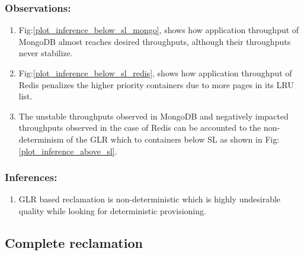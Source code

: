 	\subsubsection{Observations:}
	  \begin{enumerate}
	    \item Fig:\ref{plot_inference_below_sl_mongo}, shows how application throughput of MongoDB almost reaches desired 
throughputs, although their throughputs never stabilize.
	    \item Fig:\ref{plot_inference_below_sl_redis}, shows how application throughput of Redis penalizes the higher priority 
containers due to more pages in its LRU list.
	    \item The unstable throughputs observed in MongoDB and negatively impacted throughputs observed in the case of Redis can be 
accounted to the non-determinism of the GLR which to containers below SL as shown in Fig:\ref{plot_inference_above_sl}. 
	  \end{enumerate}
	  
	\subsubsection{Inferences:}
	  \begin{enumerate}
	    \item GLR based reclamation is non-deterministic which is highly undesirable quality while looking for deterministic 
provisioning.
	  \end{enumerate}
	
    \subsection{Complete reclamation}
	
